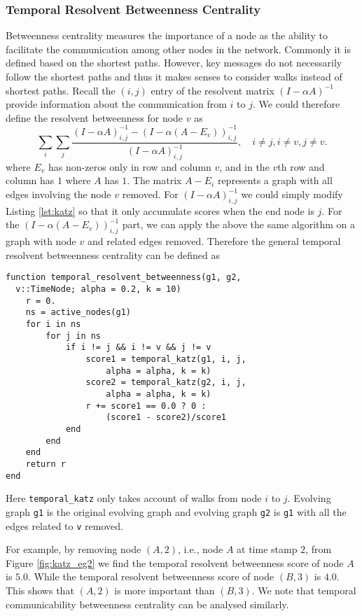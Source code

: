 \documentclass[12pt]{article}
\theoremstyle{definition}
\begin{document}
\subsubsection{Temporal Resolvent Betweenness Centrality}

Betweenness centrality measures the importance of a node as the ability to facilitate the communication among other nodes in the network. Commonly it is defined based on the shortest paths. However, key messages do not necessarily follow the shortest paths and thus it makes senses to consider walks instead of shortest paths.
Recall the $(i,j)$ entry of the resolvent matrix $(I - \alpha A)^{-1}$ provide information about the communication from $i$ to $j$. We could therefore define the resolvent betweenness for node $v$ as
\begin{equation}
  \sum_{i}\sum_j \frac{(I-\alpha A)^{-1}_{i,j} - (I - \alpha (A - E_v))^{-1}_{i,j}}{(I - \alpha A)^{-1}_{i,j}}, \quad i \ne j, i \ne v, j \ne v.
\end{equation}
where $E_v$ has non-zeros only in row and column $v$, and in the $v$th row and column has $1$ where $A$ has $1$.
The matrix $A - E_i$ represents a graph with all edges involving the node $v$ removed.
For $(I-\alpha A)^{-1}_{i,j}$ we could simply modify Listing \ref{lst:katz} so that it only accumulate scores when the end node is $j$. For the $(I - \alpha (A-E_v))^{-1}_{i,j}$ part, we can apply the above the same algorithm on a graph with node $v$ and related edges removed.
Therefore the general temporal resolvent betweenness centrality can be defined as
\begin{lstlisting}
function temporal_resolvent_betweenness(g1, g2,
  v::TimeNode; alpha = 0.2, k = 10)
    r = 0.
    ns = active_nodes(g1)
    for i in ns
        for j in ns
            if i != j && i != v && j != v
                score1 = temporal_katz(g1, i, j,
                    alpha = alpha, k = k)
                score2 = temporal_katz(g2, i, j,
                    alpha = alpha, k = k)
                r += score1 == 0.0 ? 0 :
                    (score1 - score2)/score1
            end
        end
    end
    return r
end
\end{lstlisting}
Here \texttt{temporal\_katz} only takes account of walks from node $i$ to $j$. Evolving graph
\texttt{g1} is the original evolving graph and evolving graph \texttt{g2} is \texttt{g1} with all the edges
related to \texttt{v} removed.

For example, by removing node $(A, 2)$, i.e., node $A$ at time stamp $2$, from Figure \ref{fig:katz_eg2} we find
the temporal resolvent betweenness score of node $A$ is $5.0$. While the temporal resolvent betweenness score of node $(B,3)$ is $4.0$. This shows that $(A,2)$ is more important than $(B,3)$.
We note that temporal communicability betweenness centrality can be analysed similarly.
\end{document}
